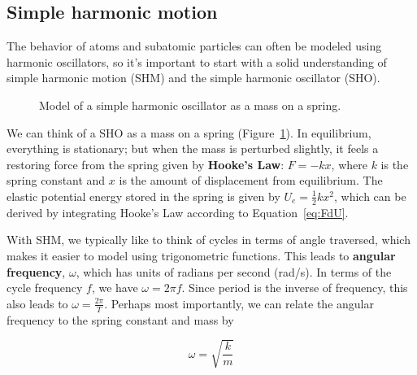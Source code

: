 
\subsection{Simple harmonic motion} \label{sec:shm}
The behavior of atoms and subatomic particles can often be modeled using harmonic oscillators, so it's important to start with a solid understanding of simple harmonic motion (SHM) and the simple harmonic oscillator (SHO). 

\begin{figure}[!h]
	\centering
	\caption{Model of a simple harmonic oscillator as a mass on a spring.}
	\label{fig:SHO-model}
\end{figure} 

We can think of a SHO as a mass on a spring (Figure~\ref{fig:SHO-model}). In equilibrium, everything is stationary; but when the mass is perturbed slightly, it feels a restoring force from the spring given by \textbf{Hooke's Law}: $F=-kx$, where $k$ is the spring constant and $x$ is the amount of displacement from equilibrium. The elastic potential energy stored in the spring is given by $U_e=\frac{1}{2}kx^2$, which can be derived by integrating Hooke's Law according to Equation~\ref{eq:FdU}. \par 

With SHM, we typically like to think of cycles in terms of angle traversed, which makes it easier to model using trigonometric functions. This leads to \textbf{angular frequency}, $\omega$, which has units of radians per second (rad/s). In terms of the cycle frequency $f$, we have $\omega = 2\pi f$. Since period is the inverse of frequency, this also leads to $\omega = \frac{2\pi}{T}$. Perhaps most importantly, we can relate the angular frequency to the spring constant and mass by 
\begin{tcolorbox}[title=Key Relationship] \vspace*{-2ex}
\begin{equation}
\omega=\sqrt{\frac{k}{m}} \label{eq:wkm}
\end{equation}
\end{tcolorbox}

